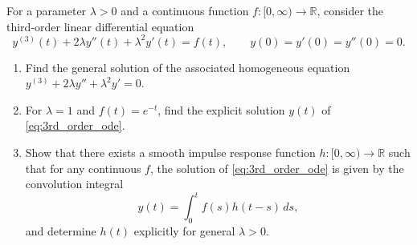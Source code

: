 \begin{exercise}
\label{ex:third_order_linear_ode}
For a parameter $\lambda > 0$ and a continuous function $f : [0,\infty) \to \mathbb{R}$, consider the third-order linear differential equation
\begin{equation}
\label{eq:3rd_order_ode}
y^{(3)}(t) + 2\lambda y''(t) + \lambda^2 y'(t) = f(t), \qquad y(0) = y'(0) = y''(0) = 0.
\end{equation}
\begin{enumerate}[label=\textbf{(\alph*)}]
  \item Find the general solution of the associated homogeneous equation $y^{(3)} + 2\lambda y'' + \lambda^2 y' = 0$.
  \item For $\lambda = 1$ and $f(t) = e^{-t}$, find the explicit solution $y(t)$ of \eqref{eq:3rd_order_ode}.
  \item Show that there exists a smooth impulse response function $h : [0,\infty) \to \mathbb{R}$ such that for any continuous $f$, the solution of \eqref{eq:3rd_order_ode} is given by the convolution integral
  \[y(t) = \int_0^t f(s) h(t-s) \, ds,\]
  and determine $h(t)$ explicitly for general $\lambda > 0$.
\end{enumerate}
\end{exercise}


